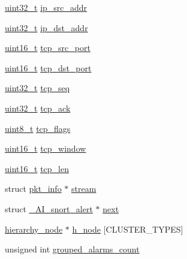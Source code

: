 \begin{DoxyCompactItemize}
\item 
\hyperlink{spp__ai_8h_a435d1572bf3f880d55459d9805097f62}{uint32\_\-t} \hyperlink{struct__AI__snort__alert_a194117c57a52933d16a97838562bb611}{ip\_\-src\_\-addr}
\item 
\hyperlink{spp__ai_8h_a435d1572bf3f880d55459d9805097f62}{uint32\_\-t} \hyperlink{struct__AI__snort__alert_a754ca683593c838e4032fa8c13b1512b}{ip\_\-dst\_\-addr}
\item 
\hyperlink{spp__ai_8h_a273cf69d639a59973b6019625df33e30}{uint16\_\-t} \hyperlink{struct__AI__snort__alert_a4d4cbdbd9675f4c43545547f55174cb7}{tcp\_\-src\_\-port}
\item 
\hyperlink{spp__ai_8h_a273cf69d639a59973b6019625df33e30}{uint16\_\-t} \hyperlink{struct__AI__snort__alert_aaca31cb67d48ffc3bfd1227686d5f5a4}{tcp\_\-dst\_\-port}
\item 
\hyperlink{spp__ai_8h_a435d1572bf3f880d55459d9805097f62}{uint32\_\-t} \hyperlink{struct__AI__snort__alert_ad6edf59fccea55bf5f940bf36117020b}{tcp\_\-seq}
\item 
\hyperlink{spp__ai_8h_a435d1572bf3f880d55459d9805097f62}{uint32\_\-t} \hyperlink{struct__AI__snort__alert_a8aac577224a4325ec50511c6d79b4b79}{tcp\_\-ack}
\item 
\hyperlink{spp__ai_8h_aba7bc1797add20fe3efdf37ced1182c5}{uint8\_\-t} \hyperlink{struct__AI__snort__alert_aa643f11db93b70242b57f0a04775e507}{tcp\_\-flags}
\item 
\hyperlink{spp__ai_8h_a273cf69d639a59973b6019625df33e30}{uint16\_\-t} \hyperlink{struct__AI__snort__alert_a1687fccc26bb211591db8b36ffec5348}{tcp\_\-window}
\item 
\hyperlink{spp__ai_8h_a273cf69d639a59973b6019625df33e30}{uint16\_\-t} \hyperlink{struct__AI__snort__alert_ab7e0507050b8e475fea7a4b26c768857}{tcp\_\-len}
\item 
struct \hyperlink{structpkt__info}{pkt\_\-info} $\ast$ \hyperlink{struct__AI__snort__alert_a09dfe0a841fd3912ec78060d4547cb31}{stream}
\item 
struct \hyperlink{struct__AI__snort__alert}{\_\-AI\_\-snort\_\-alert} $\ast$ \hyperlink{struct__AI__snort__alert_aa8336d4b3359015ed8ea312ca1fd1173}{next}
\item 
\hyperlink{struct__hierarchy__node}{hierarchy\_\-node} $\ast$ \hyperlink{struct__AI__snort__alert_ac53765584296ead1328eabfaba8a3aed}{h\_\-node} \mbox{[}CLUSTER\_\-TYPES\mbox{]}
\item 
unsigned int \hyperlink{struct__AI__snort__alert_a285aff12d6bac03c316ccc5305d28e53}{grouped\_\-alarms\_\-count}
\end{DoxyCompactItemize}


